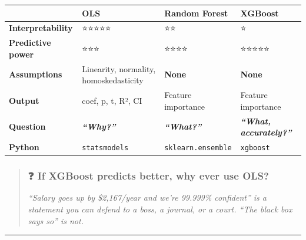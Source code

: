 \documentclass[
]{article}
\begin{document}
\begin{longtable}[]{@{}
  >{\raggedright\arraybackslash}p{}
  >{\raggedright\arraybackslash}p{}
  >{\raggedright\arraybackslash}p{}
  >{\raggedright\arraybackslash}p{}@{}}
\toprule\noalign{}
\begin{minipage}[b]{\linewidth}\raggedright
\end{minipage} & \begin{minipage}[b]{\linewidth}\raggedright
OLS
\end{minipage} & \begin{minipage}[b]{\linewidth}\raggedright
Random Forest
\end{minipage} & \begin{minipage}[b]{\linewidth}\raggedright
XGBoost
\end{minipage} \\
\midrule\noalign{}
\endhead
\bottomrule\noalign{}
\endlastfoot
\textbf{Interpretability} & ⭐⭐⭐⭐⭐ & ⭐⭐ & ⭐ \\
\textbf{Predictive power} & ⭐⭐⭐ & ⭐⭐⭐⭐ & ⭐⭐⭐⭐⭐ \\
\textbf{Assumptions} & Linearity, normality, homoskedasticity &
\textbf{None} & \textbf{None} \\
\textbf{Output} & coef, p, t, R², CI & Feature importance & Feature
importance \\
\textbf{Question} & \textbf{\emph{``Why?''}} & \textbf{\emph{``What?''}}
& \textbf{\emph{``What, accurately?''}} \\
\textbf{Python} & \texttt{statsmodels} & \texttt{sklearn.ensemble} &
\texttt{xgboost} \\
\end{longtable}

\begin{quote}
\subsubsection{❓ If XGBoost predicts better, why ever use
OLS?}\label{if-xgboost-predicts-better-why-ever-use-ols}

\emph{``Salary goes up by \$2,167/year and we're 99.999\% confident'' is
a statement you can defend to a boss, a journal, or a court. ``The black
box says so'' is not.}
\end{quote}

\begin{center}\rule{0.5\linewidth}{0.5pt}\end{center}
\end{document}
